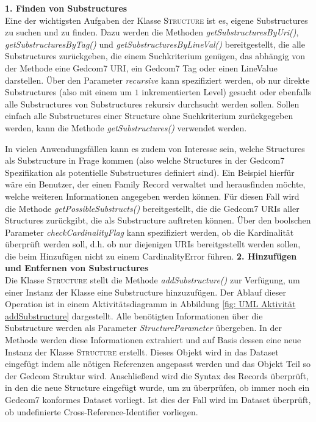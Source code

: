 \vspace{1em}
\textbf{1. Finden von Substructures} \vspace{0.5em} \\
Eine der wichtigsten Aufgaben der Klasse \textsc{Structure} ist es, eigene Substructures zu suchen und zu finden. Dazu werden die Methoden \textit{getSubstructuresByUri()}, \textit{getSubstructuresByTag()} und \textit{getSubstructuresByLineVal()} bereitgestellt, die alle Substructures zurückgeben, die einem Suchkriterium genügen, das abhängig von der Methode eine Gedcom7 URI, ein Gedcom7 Tag oder einen LineValue darstellen. Über den Parameter \textit{recursive} kann spezifiziert werden, ob nur direkte Substructures (also mit einem um $1$ inkrementierten Level) gesucht oder ebenfalls alle Substructures von Substructures rekursiv durchsucht werden sollen. Sollen einfach alle Substructures einer Structure ohne Suchkriterium zurückgegeben werden, kann die Methode \textit{getSubstructures()} verwendet werden.


In vielen Anwendungsfällen kann es zudem von Interesse sein, welche Structures als Substructure in Frage kommen (also welche Structures in der Gedcom7 Spezifikation als potentielle Substructures definiert sind). Ein Beispiel hierfür wäre ein Benutzer, der einen Family Record verwaltet und herausfinden möchte, welche weiteren Informationen angegeben werden können. Für diesen Fall wird die Methode \textit{getPossibleSubstructs()} bereitgestellt, die die Gedcom7 URIs aller Structures zurückgibt, die als Substructure auftreten können. Über den boolschen Parameter \textit{checkCardinalityFlag} kann spezifiziert werden, ob die Kardinalität überprüft werden soll, d.h. ob nur diejenigen URIs bereitgestellt werden sollen, die beim Hinzufügen nicht zu einem CardinalityError führen. 
\newpage
\vspace{1em}
\textbf{2. Hinzufügen und Entfernen von Substructures} \vspace{0.5em} \\
Die Klasse \textsc{Structure} stellt die Methode \textit{addSubstructure()} zur Verfügung, um einer Instanz der Klasse eine Substructure hinzuzufügen. Der Ablauf dieser Operation ist in einem Aktivitätsdiagramm in Abbildung \ref{fig: UML Aktivität addSubstructure} dargestellt. Alle benötigten Informationen über die Substructure werden als Parameter \textit{StructureParameter} übergeben. In der Methode werden diese Informationen extrahiert und auf Basis dessen eine neue Instanz der Klasse \textsc{Structure} erstellt. Dieses Objekt wird in das Dataset eingefügt indem alle nötigen Referenzen angepasst werden und das Objekt Teil so der Gedcom Struktur wird. Anschließend wird die Syntax des Records überprüft, in den die neue Structure eingefügt wurde, um zu überprüfen, ob immer noch ein Gedcom7 konformes Dataset vorliegt. Ist dies der Fall wird im Dataset überprüft, ob undefinierte Cross-Reference-Identifier vorliegen. 


